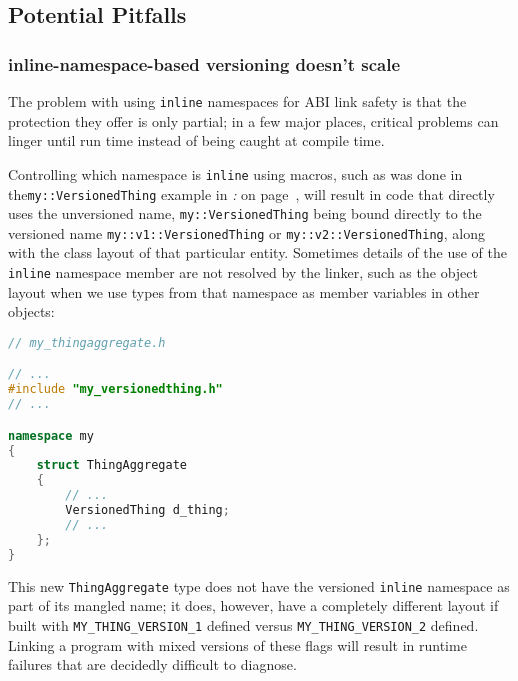 \subsection[Potential Pitfalls]{Potential Pitfalls}\label{potential-pitfalls-inlinenamespace}

\subsubsection[{\tt inline}-namespace-based versioning doesn’t scale]{{\SubsubsecCode inline}-namespace-based versioning doesn’t scale}\label{inline-namespace-based-versioning-doesn’t-scale}

The problem with using \texttt{inline} namespaces for ABI link safety is
that the protection they offer is only partial; in a few major places,
critical problems can linger until run time instead of being caught at
compile time.

Controlling which namespace is \texttt{inline} using macros, such as was
done in the\linebreak[4] \texttt{my::VersionedThing} example in \textit{: } on page~\pageref{link-safe-abi-versioning}, will result in code that
directly uses the unversioned name, \texttt{my::VersionedThing} being
bound directly to the versioned name \texttt{my::v1::VersionedThing} or
\texttt{my::v2::VersionedThing}, along with the class layout of that
particular entity. Sometimes details of the use of the \texttt{inline}
namespace member are not resolved by the linker, such as the object
layout when we use types from that namespace as member variables in
other objects:

\begin{lstlisting}[language=C++]
// my_thingaggregate.h

// ...
#include "my_versionedthing.h"
// ...

namespace my
{
    struct ThingAggregate
    {
        // ...
        VersionedThing d_thing;
        // ...
    };
}
\end{lstlisting}
    
\noindent This new \texttt{ThingAggregate} type does not have the versioned
\texttt{inline} namespace as part of its mangled name; it does, however,
have a completely different layout if built with
\texttt{MY\_THING\_VERSION\_1} defined
versus \texttt{MY\_THING\_VERSION\_2} defined. Linking a program with mixed
versions of these flags will result in runtime failures that are
decidedly difficult to diagnose.

